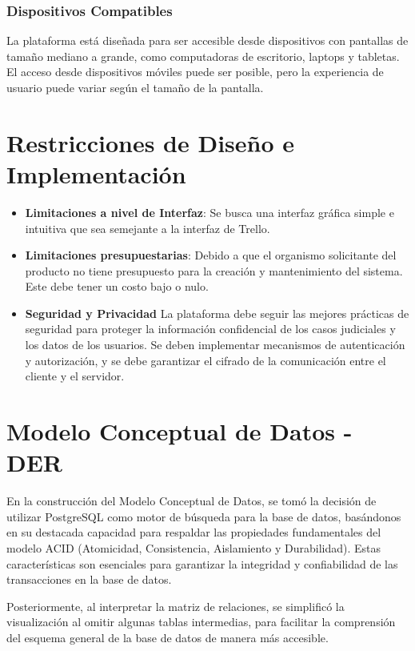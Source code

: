 \subsubsection{Dispositivos Compatibles}
La plataforma está diseñada para ser accesible desde dispositivos con pantallas de tamaño mediano a grande, como computadoras de escritorio, laptops y tabletas. El acceso desde dispositivos móviles puede ser posible, pero la experiencia de usuario puede variar según el tamaño de la pantalla.




\section{Restricciones de Diseño e Implementación}
\begin{itemize}
    \item \textbf{Limitaciones a nivel de Interfaz}:  Se busca una interfaz gráfica simple e intuitiva que sea semejante a la interfaz de Trello.
    \item \textbf{Limitaciones presupuestarias}: Debido a que el organismo solicitante del producto no tiene presupuesto para la creación y mantenimiento del sistema. Este debe tener un costo bajo o nulo.
    \item \textbf{Seguridad y Privacidad}
    La plataforma debe seguir las mejores prácticas de seguridad para proteger la información confidencial de los casos judiciales y los datos de los usuarios. Se deben implementar mecanismos de autenticación y autorización, y se debe garantizar el cifrado de la comunicación entre el cliente y el servidor.
\end{itemize}


\section{Modelo Conceptual de Datos - DER}

En la construcción del Modelo Conceptual de Datos, se tomó la decisión de utilizar PostgreSQL como motor de búsqueda para la base de datos, basándonos en su destacada capacidad para respaldar las propiedades fundamentales del modelo ACID (Atomicidad, Consistencia, Aislamiento y Durabilidad). Estas características son esenciales para garantizar la integridad y confiabilidad de las transacciones en la base de datos.

Posteriormente, al interpretar la matriz de relaciones, se simplificó la visualización al omitir algunas tablas intermedias, para facilitar la comprensión del esquema general de la base de datos de manera más accesible.

